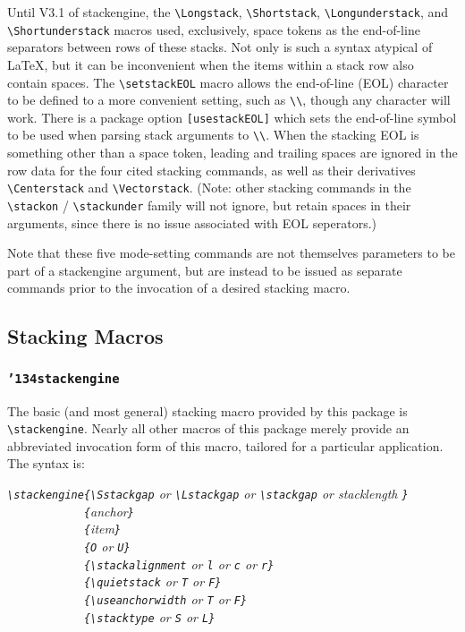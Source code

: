 \documentclass{article}
\def\ste{\textsf{stackengine}}
\let\vb\verb
\newcommand\margtt[1]{\marginpar{\hfill\ttfamily#1}}
\newcommand\margcmd[1]{\marginpar{\hfill\ttfamily\char'134#1}}
\newcommand\cmd[1]{\texttt{\char'134#1}}
\begin{document}
Until V3.1 of \ste, the \vb|\Longstack|, \vb|\Shortstack|, 
\vb|\Longunderstack|, and \vb|\Shortunderstack| macros used,
exclusively, space tokens as the end-of-line separators between
rows of these stacks.  Not only is such a syntax atypical of \LaTeX{}, 
but it can be inconvenient when the items within a stack row
also contain spaces.  The \vb|\setstackEOL| 
\margcmd{setstackEOL}macro allows the end-of-line (EOL)
character to be defined to a more convenient setting, such as \vb|\\|,
though any character will work.  There is a package option 
\vb|[usestackEOL]| \margtt{[usestackEOL]\rmfamily\\\raggedleft package
option} which sets the end-of-line symbol to be used when parsing stack
arguments to \vb|\\|.  When the stacking EOL is something other than a
space token, leading and trailing spaces are ignored in the row data for
the four cited stacking commands, as well as their derivatives 
\vb|\Centerstack| and \vb|\Vectorstack|.  (Note: other stacking commands
in the \vb|\stackon| / \vb|\stackunder| family will not ignore, but
retain spaces in their arguments, since there is no issue associated
with EOL seperators.)

Note that these five mode-setting commands are not themselves parameters
to be part of a {\ste} argument, but are instead to be issued as separate
commands prior to the invocation of a desired stacking macro.

\subsection{Stacking Macros}

\subsubsection{\cmd{stackengine}\label{s:stackeng}}

\begin{sloppypar}
The basic (and most general) stacking macro provided by this package is
\vb|\stackengine|.  Nearly all other macros of this package merely
provide an abbreviated invocation form of this macro, tailored for a
particular application.  The syntax is:
\end{sloppypar}

\itshape
\vb|\stackengine{\Sstackgap| or
  \vb|\Lstackgap| or
  \vb|\stackgap| or stacklength%
  \vb|}|\\
\vb|            {|anchor\vb|}|\\
\vb|            {|item\vb|}|\\
\vb|            {O| or \vb|U}|\\
\vb|            {\stackalignment| or
  \vb|l| or
  \vb|c| or
  \vb|r}|\\
\vb|            {\quietstack| or \vb|T| or \vb|F}|\\
\vb|            {\useanchorwidth| or \vb|T| or \vb|F}|\\
\vb|            {\stacktype| or \vb|S| or \vb|L}|
\upshape
\end{document}

